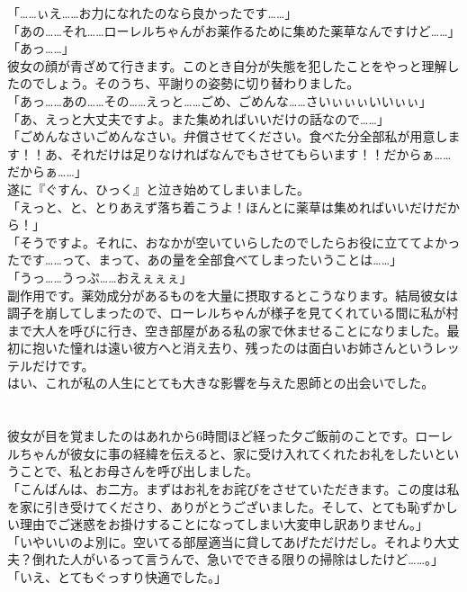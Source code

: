 \documentclass[oneside, a4paper]{jsbook}
\begin{document}
\noindent
「……ぃえ……お力になれたのなら良かったです……」\\
「あの……それ……ローレルちゃんがお薬作るために集めた薬草なんですけど……」\\
「あっ……」\\

彼女の顔が青ざめて行きます。このとき自分が失態を犯したことをやっと理解したのでしょう。そのうち、平謝りの姿勢に切り替わりました。\\

\noindent
「あっ……あの……その……えっと……ごめ、ごめんな……さいぃぃぃいいぃぃ」\\
「あ、えっと大丈夫ですよ。また集めればいいだけの話なので……」\\
「ごめんなさいごめんなさい。弁償させてください。食べた分全部私が用意します！！あ、それだけは足りなければなんでもさせてもらいます！！だからぁ……だからぁ……」\\

遂に『ぐすん、ひっく』と泣き始めてしまいました。\\

「えっと、と、とりあえず落ち着こうよ！ほんとに薬草は集めればいいだけだから！」\\
「そうですよ。それに、おなかが空いていらしたのでしたらお役に立ててよかったです……って、まって、あの量を全部食べてしまったいうことは……」\\
「うっ……うっぷ……おえぇぇぇ」\\

副作用です。薬効成分があるものを大量に摂取するとこうなります。結局彼女は調子を崩してしまったので、ローレルちゃんが様子を見てくれている間に私が村まで大人を呼びに行き、空き部屋がある私の家で休ませることになりました。最初に抱いた憧れは遠い彼方へと消え去り、残ったのは面白いお姉さんというレッテルだけです。\\

はい、これが私の人生にとても大きな影響を与えた恩師との出会いでした。\\\\\\

彼女が目を覚ましたのはあれから6時間ほど経った夕ご飯前のことです。ローレルちゃんが彼女に事の経緯を伝えると、家に受け入れてくれたお礼をしたいということで、私とお母さんを呼び出しました。\\

「こんばんは、お二方。まずはお礼をお詫びをさせていただきます。この度は私を家に引き受けてくださり、ありがとうございました。そして、とても恥ずかしい理由でご迷惑をお掛けすることになってしまい大変申し訳ありません。」\\
「いやいいのよ別に。空いてる部屋適当に貸してあげただけだし。それより大丈夫？倒れた人がいるって言うんで、急いでできる限りの掃除はしたけど……。」\\
「いえ、とてもぐっすり快適でした。」\\
\end{document}
